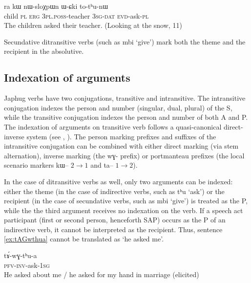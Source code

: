 \documentclass[oldfontcommands,oneside,a4paper,11pt]{article}
\newcommand{\ipa}[1]{{\phon #1}} %
\begin{document}
 \begin{exe}
   \ex   \label{ex:tathu}
 \gll \ipa{tɤpɤtso}  	\ipa{ra}  	\ipa{kɯ}  	\ipa{nɯ-sloχpɯn}  	\ipa{ɯ-ɕki}  	\ipa{to-tʰu-nɯ}  \\
child \textsc{pl} \textsc{erg} \textsc{3pl.poss}-teacher \textsc{3sg-dat} \textsc{evd}-ask-\textsc{pl} \\
\glt The children asked their teacher. (Looking at the snow, 11)
   \end{exe}  

Secundative  ditransitive verbs (such as \ipa{mbi} `give') mark both the theme and the recipient in the absolutive.
 

\subsection{Indexation of arguments}

Japhug verbs have two conjugations, transitive and intransitive. The intransitive conjugation indexes the person and number (singular, dual, plural) of the S, while the transitive conjugation indexes the person and number of both A and P. The indexation of arguments on transitive verb follows a quasi-canonical direct-inverse system (see \citealt{jacques10inverse}, \citealt{jacques14inverse}). The person marking prefixes and suffixes of the intransitive conjugation can be combined with either direct marking (via stem alternation), inverse marking (the \ipa{wɣ-} prefix) or portmanteau prefixes (the local scenario markers \ipa{kɯ--} $2\rightarrow1$ and \ipa{ta--} $1\rightarrow2$).


In the case of ditransitive verbs as well, only two arguments can be indexed: either the theme (in the case of indirective verbs, such as \ipa{tʰu} `ask') or the recipient (in the case of secundative verbs, such as \ipa{mbi} `give') is treated as the P, while the the third argument receives no indexation on the verb. If a  speech act participant (first or second person, henceforth SAP) occurs as the P of an indirective verb, it cannot be interpreted as the recipient. Thus, sentence \ref{ex:tAGwthua} cannot be translated as `he asked me'.

 \begin{exe}
   \ex   \label{ex:tAGwthua}
 \gll
\ipa{tɤ́-wɣ-tʰu-a} \\
\textsc{pfv-inv}-ask-\textsc{1sg}\\
\glt He asked about me / he asked for my hand in marriage (elicited)   
      \end{exe}  
      
\end{document}
